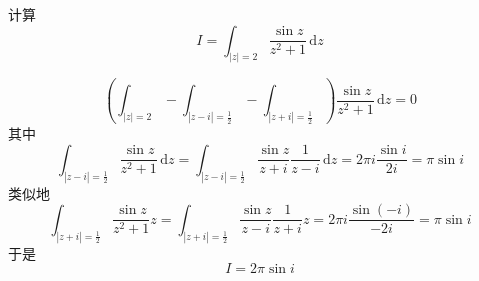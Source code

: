 \documentclass[../../复变函数.tex]{subfiles}
\begin{document}
\begin{example}
    计算 \[
    I =  \int_{\left| z \right|= 2 } \frac{\sin z }{z^{2}+ 1 }\,\mathrm{d} z 
    \]
\end{example}
\begin{solution}
    \[
    \left( \int_{\left| z \right|= 2 }-\int_{\left| z-i \right|= \frac{1}{2} }-\int_{\left| z+ i \right|= \frac{1}{2} } \right)\frac{\sin z }{z^{2}+ 1 }\,\mathrm{d} z  = 0
    \]其中 \[
    \int_{\left| z-i \right|= \frac{1}{2} }\frac{\sin z }{z^{2}+ 1 }\,\mathrm{d} z=  \int_{\left| z-i \right|= \frac{1}{2} }\frac{\sin z }{z+ i } \frac{1}{z-i}\,\mathrm{d} z= 2\pi i \frac{\sin i }{2i }= \pi \sin i   
    \]类似地 \[
    \int_{\left| z+ i \right|= \frac{1}{2} }\frac{\sin z }{z^{2}+ 1 }z= \int_{\left| z+ i \right|= \frac{1}{2} }\frac{\sin z }{z-i }\frac{1 }{z+ i }z=    2\pi i\frac{\sin \left( -i \right)  }{-2i }= \pi \sin i 
    \]于是 \[
    I =  2\pi \sin i
    \]
\end{solution}

\hspace*{\fill} 

\hspace*{\fill} 
\end{document}
